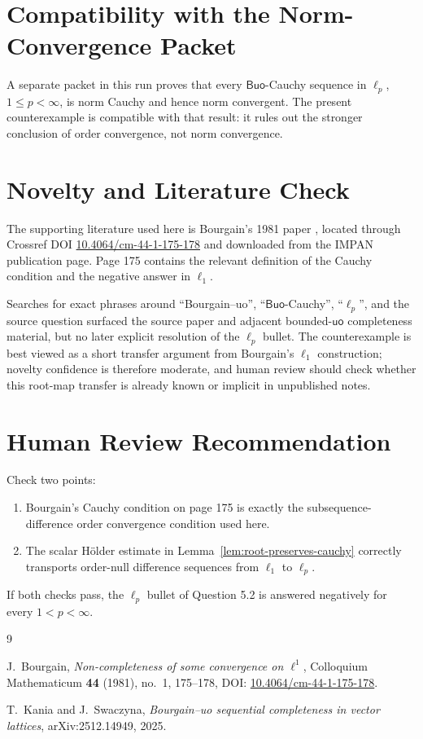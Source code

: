 \documentclass[11pt]{article}
\newcommand{\Buo}{\mathsf{Buo}}
\newcommand{\uo}{\mathsf{uo}}
\begin{document}
\section*{Compatibility with the Norm-Convergence Packet}

A separate packet in this run proves that every \(\Buo\)-Cauchy sequence in
\(\ell_p\), \(1\le p<\infty\), is norm Cauchy and hence norm convergent.  The
present counterexample is compatible with that result: it rules out the
stronger conclusion of order convergence, not norm convergence.

\section*{Novelty and Literature Check}

The supporting literature used here is Bourgain's 1981 paper
\cite{Bourgain1981}, located through Crossref DOI
\href{https://doi.org/10.4064/cm-44-1-175-178}{10.4064/cm-44-1-175-178} and
downloaded from the IMPAN publication page.  Page 175 contains the relevant
definition of the Cauchy condition and the negative answer in \(\ell_1\).

Searches for exact phrases around ``Bourgain--uo'', ``\(\Buo\)-Cauchy'',
``\(\ell_p\)'', and the source question surfaced the source paper and adjacent
bounded-\(\uo\) completeness material, but no later explicit resolution of the
\(\ell_p\) bullet.  The counterexample is best viewed as a short transfer
argument from Bourgain's \(\ell_1\) construction; novelty confidence is
therefore moderate, and human review should check whether this root-map
transfer is already known or implicit in unpublished notes.

\section*{Human Review Recommendation}

Check two points:
\begin{enumerate}
\item Bourgain's Cauchy condition on page 175 is exactly the
      subsequence-difference order convergence condition used here.
\item The scalar Hölder estimate in Lemma~\ref{lem:root-preserves-cauchy}
      correctly transports order-null difference sequences from \(\ell_1\) to
      \(\ell_p\).
\end{enumerate}
If both checks pass, the \(\ell_p\) bullet of Question 5.2 is answered
negatively for every \(1<p<\infty\).

\begin{thebibliography}{9}

J.~Bourgain,
\newblock \emph{Non-completeness of some convergence on \(\ell^1\)},
\newblock Colloquium Mathematicum \textbf{44} (1981), no.~1, 175--178,
\newblock DOI: \href{https://doi.org/10.4064/cm-44-1-175-178}{10.4064/cm-44-1-175-178}.

T.~Kania and J.~Swaczyna,
\newblock \emph{Bourgain--uo sequential completeness in vector lattices},
\newblock arXiv:2512.14949, 2025.

\end{thebibliography}
\end{document}
